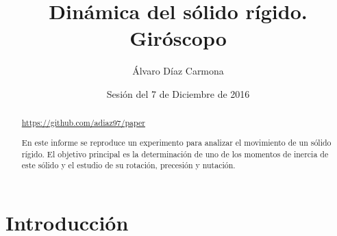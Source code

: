 \documentclass[a4paper]{article}
\begin{document}
\title{Dinámica del sólido rígido. Giróscopo}
\author{Álvaro Díaz Carmona}
\date{Sesión del 7 de Diciembre de 2016}
\maketitle
\begin{abstract}
\url{https://github.com/adiaz97/paper}

En este informe se reproduce un experimento para analizar el movimiento de un sólido rígido. El objetivo principal es la determinación de uno de los momentos de inercia de este sólido y el estudio de su rotación, precesión y nutación.

\end{abstract}

\section{Introducción}
\end{document}
